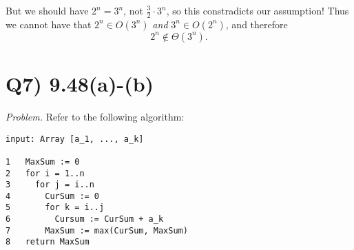 \documentclass{article}
\begin{document}
But we should have $2^n = 3^n$, not $\frac{3}{2}\cdot3^n$, so this constradicts our assumption! Thus we cannot have that $2^n \in O(3^n)$ \textit{and} $3^n \in O(2^n)$, and therefore $$2^n \not\in \Theta(3^n).$$




\section*{Q7) 9.48(a)-(b)}

\textit{Problem.} Refer to the following algorithm: 

\begin{verbatim}
input: Array [a_1, ..., a_k]

1   MaxSum := 0
2   for i = 1..n
3     for j = i..n
4       CurSum := 0
5       for k = i..j
6         Cursum := CurSum + a_k
7       MaxSum := max(CurSum, MaxSum)
8   return MaxSum
\end{verbatim}
\end{document}
